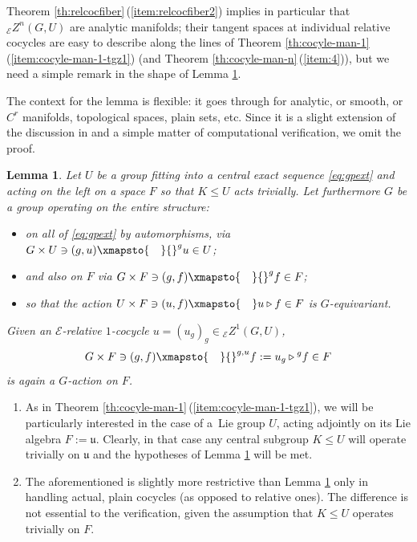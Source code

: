 \documentclass[10pt,a4paper]{amsart}
\numberwithin{equation}{section}
\newtheorem{Lemma}[Theorem]{Lemma}
\newcommand\cE{{\mathcal E}}
\newcommand\fu{{\mathfrak u}}
\begin{document}
Theorem \ref{th:relcocfiber}\,(\ref{item:relcocfiber2}) implies in particular that ${}_{\cE}Z^n(G,U)$ are analytic manifolds; their tangent spaces at individual relative cocycles are easy to describe along the lines of Theorem \ref{th:cocyle-man-1}\,(\ref{item:cocyle-man-1-tgz1}) (and Theorem \ref{th:cocyle-man-n}\,(\ref{item:4})), but we need a simple remark in the shape of Lemma \ref{le:equivact}.

The context for the lemma is flexible: it goes through for analytic, or smooth, or $C^r$ manifolds, topological spaces, plain sets, etc. Since it is a slight extension of the discussion in \cite[Section~5.3]{ser-gal} and a simple matter of computational verification, we omit the proof.



\begin{Lemma}\label{le:equivact}
 Let $U$ be a group fitting into a central exact sequence \eqref{eq:gpext} and acting on the left on a space $F$ so that $K\le U$ acts trivially. Let furthermore $G$ be a group operating on the entire structure:
 \begin{itemize}\itemsep=0pt
 \item on all of \eqref{eq:gpext} by automorphisms, via $ G\times U\ni (g,u)\xmapsto{\quad}{}^g u\in U$;
 \item and also on $F$ via $ G\times F\ni (g,f)\xmapsto{\quad}{}^g f\in F$;
 \item so that the action $U\times F\ni (u,f)\xmapsto{\quad} u\triangleright f \in F$
 is $G$-equivariant.
 \end{itemize}
 Given an $\cE$-relative $1$-cocycle $u=(u_g)_g\in {}_{\cE}Z^1(G,U)$,
 \begin{equation*}
 G\times F\ni (g,f)\xmapsto{\quad}
 {}^{g,u} f := u_g\triangleright {}^g f
 \in F
 \end{equation*}
 is again a $G$-action on $F$. \qedhere
\end{Lemma}

\begin{Remarks}\label{res:howserre}\quad
 \begin{enumerate}[(1)]\itemsep=0pt

 \item As in Theorem \ref{th:cocyle-man-1}\,(\ref{item:cocyle-man-1-tgz1}), we will be particularly interested in the case of a~Lie group $U$, acting adjointly on its Lie algebra $F:=\fu$. Clearly, in that case any central subgroup $K\le U$ will operate trivially on $\fu$ and the hypotheses of Lemma \ref{le:equivact} will be met.

 \item The aforementioned \cite[Section~5.3]{ser-gal} is slightly more restrictive than Lemma \ref{le:equivact} only in handling actual, plain cocycles (as opposed to relative ones). The difference is not essential to the verification, given the assumption that $K\le U$ operates trivially on $F$.
 \end{enumerate}
\end{Remarks}
\end{document}
